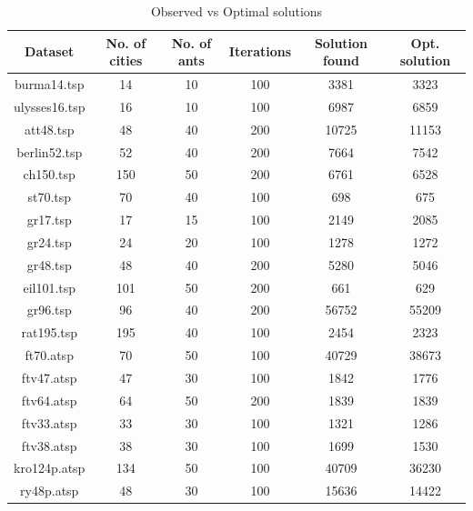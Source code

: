 \documentclass[11pt, english]{article}
\begin{document}
\begin{table}[h!]
  \begin{center}
    \caption{Observed vs Optimal solutions}
    \label{tab:table1}
    \begin{tabular}{c|c|c|c|c|c}
      \textbf{Dataset} & \textbf{No. of cities} & \textbf{No. of ants} & \textbf{Iterations} & \textbf{Solution found}  &\textbf{Opt. solution}\\ %
      \hline
      {burma14.tsp} & 14 & 10 & 100 & 3381 & 3323 \\ %
      {ulysses16.tsp} & 16 & 10 & 100 & 6987 & 6859 \\ 
	 {att48.tsp} & 48 & 40 & 200 & 10725 & 11153 \\ %
	 {berlin52.tsp} & 52 & 40 & 200 & 7664 & 7542 \\ %
	 {ch150.tsp} & 150 & 50 & 200 & 6761 & 6528 \\ %
	 {st70.tsp} & 70 & 40 & 100 & 698 & 675 \\ %
	 {gr17.tsp} & 17 & 15 & 100 & 2149 & 2085 \\ %
	 {gr24.tsp} & 24 & 20 & 100 & 1278 & 1272 \\ %
	 {gr48.tsp} & 48 & 40 & 200 & 5280 & 5046 \\ %
	 {eil101.tsp} & 101 & 50 & 200 & 661 & 629 \\ %
	 {gr96.tsp} & 96 & 40 & 200 & 56752 & 55209 \\ %
	 {rat195.tsp} & 195 & 40 & 100 & 2454 & 2323 \\ %
	 {ft70.atsp} & 70 & 50 & 100 & 40729 & 38673 \\ %
	 {ftv47.atsp} & 47 & 30 & 100 & 1842 & 1776 \\ %
	 {ftv64.atsp} & 64 & 50 & 200 & 1839 & 1839 \\ %
	 {ftv33.atsp} & 33 & 30 & 100 & 1321 & 1286 \\ %
	 {ftv38.atsp} & 38 & 30 & 100 & 1699 & 1530 \\ %
	 {kro124p.atsp} & 134 & 50 & 100 & 40709 &  36230 \\ %
	 {ry48p.atsp} & 48 & 30 & 100 & 15636 & 14422 \\ %
	 
    \end{tabular}
  \end{center}
\end{table}
\newpage
\end{document}
